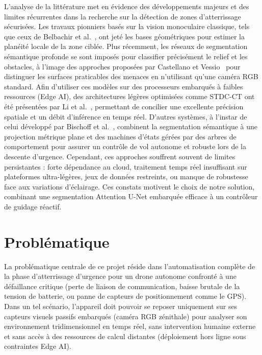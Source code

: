 L'analyse de la littérature met en évidence des développements majeurs et des limites récurrentes dans la recherche sur la détection de zones d'atterrissage sécurisées. Les travaux pionniers basés sur la vision monoculaire classique, tels que ceux de Belbachir et al.~\cite{belbachir2016landing}, ont jeté les bases géométriques pour estimer la planéité locale de la zone ciblée. Plus récemment, les réseaux de segmentation sémantique profonde se sont imposés pour classifier précisément le relief et les obstacles, à l'image des approches proposées par Castellano et Vessio~\cite{castellano2021image} pour distinguer les surfaces praticables des menaces en n'utilisant qu'une caméra RGB standard. Afin d'utiliser ces modèles sur des processeurs embarqués à faibles ressources (Edge AI), des architectures légères optimisées comme STDC-CT ont été présentées par Li et al.~\cite{li2023realtime}, permettant de concilier une excellente précision spatiale et un débit d'inférence en temps réel. D'autres systèmes, à l'instar de celui développé par Bischoff et al.~\cite{bischoff2022image}, combinent la segmentation sémantique à une projection métrique plane et des machines d'états gérées par des arbres de comportement pour assurer un contrôle de vol autonome et robuste lors de la descente d'urgence. Cependant, ces approches souffrent souvent de limites persistantes : forte dépendance au cloud, traitement temps réel insuffisant sur plateformes ultra-légères, jeux de données restreints, ou manque de robustesse face aux variations d'éclairage. Ces constats motivent le choix de notre solution, combinant une segmentation Attention U-Net embarquée efficace à un contrôleur de guidage réactif.

\section{Problématique}
\label{sec:problematique}

La problématique centrale de ce projet réside dans l'automatisation complète de la phase d'atterrissage d'urgence pour un drone autonome confronté à une défaillance critique (perte de liaison de communication, baisse brutale de la tension de batterie, ou panne de capteurs de positionnement comme le GPS). Dans un tel scénario, l'appareil doit pouvoir se reposer uniquement sur ses capteurs visuels passifs embarqués (caméra RGB zénithale) pour analyser son environnement tridimensionnel en temps réel, sans intervention humaine externe et sans accès à des ressources de calcul distantes (déploiement hors ligne sous contraintes Edge AI).


